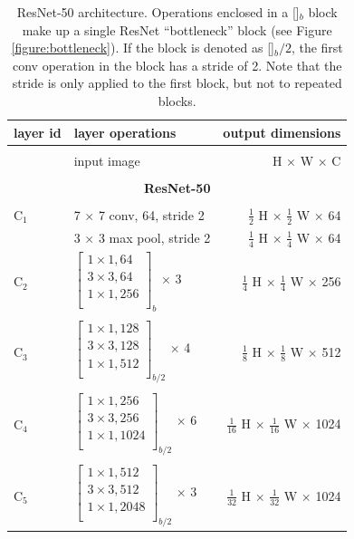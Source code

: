 {
\begin{table}[h]
\centering
\begin{tabular}{llr}
 layer id & layer operations & output dimensions \\
\toprule \\
 & input image & H $\times$ W $\times$ C \\
\midrule \\
\multicolumn{3}{c}{\textbf{ResNet-50}}\\
\midrule \\
C$_1$ & 7 $\times$ 7 conv, 64, stride 2 & $\tfrac{1}{2}$ H $\times$ $\tfrac{1}{2}$ W $\times$ 64 \\

& 3 $\times$ 3 max pool, stride 2 & $\tfrac{1}{4}$ H $\times$ $\tfrac{1}{4}$ W $\times$ 64 \\

C$_2$ &
$\begin{bmatrix}
1 \times 1, 64 \\
3 \times 3, 64 \\
1 \times 1, 256 \\
\end{bmatrix}_b$ $\times$ 3
& $\tfrac{1}{4}$ H $\times$ $\tfrac{1}{4}$ W $\times$ 256 \\
\midrule \\
C$_3$ &
$\begin{bmatrix}
1 \times 1, 128 \\
3 \times 3, 128 \\
1 \times 1, 512 \\
\end{bmatrix}_{b/2}$ $\times$ 4
& $\tfrac{1}{8}$ H $\times$ $\tfrac{1}{8}$ W $\times$ 512 \\
\midrule \\
C$_4$ &
$\begin{bmatrix}
1 \times 1, 256 \\
3 \times 3, 256 \\
1 \times 1, 1024 \\
\end{bmatrix}_{b/2}$ $\times$ 6
& $\tfrac{1}{16}$ H $\times$ $\tfrac{1}{16}$ W $\times$ 1024 \\
\midrule \\
C$_5$ &
$\begin{bmatrix}
1 \times 1, 512 \\
3 \times 3, 512 \\
1 \times 1, 2048 \\
\end{bmatrix}_{b/2}$ $\times$ 3
& $\tfrac{1}{32}$ H $\times$ $\tfrac{1}{32}$ W $\times$ 1024 \\

\bottomrule
\end{tabular}

\caption {
ResNet-50 \cite{ResNet} architecture.
Operations enclosed in a []$_b$ block make up a single ResNet \enquote{bottleneck}
block (see Figure \ref{figure:bottleneck}). If the block is denoted as []$_b/2$,
the first conv operation in the block has a stride of 2. Note that the stride
is only applied to the first block, but not to repeated blocks.
}
\label{table:resnet}
\end{table}
}

